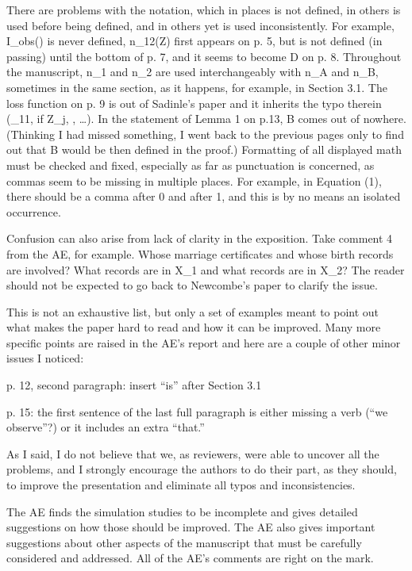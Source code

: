 \documentclass[letterpaper, parskip]{scrartcl}
\begin{document}
	There are problems with the notation, which in places is not defined, in others is used before being defined, and in others yet is used inconsistently.  For example, I_obs() is never defined, n_12(Z) first appears on p. 5, but is not defined (in passing) until the bottom of p. 7, and it seems to become D on p. 8.  Throughout the manuscript, n_1 and n_2 are used interchangeably with n_A and n_B, sometimes in the same section, as it happens, for example, in Section 3.1.  The loss function on p. 9 is out of Sadinle’s paper and it inherits the typo therein (\theta_11, if Z_j, , …).  In the statement of Lemma 1 on p.13, B comes out of nowhere.  (Thinking I had missed something, I went back to the previous pages only to find out that B would be then defined in the proof.)  Formatting of all displayed math must be checked and fixed, especially as far as punctuation is concerned, as commas seem to be missing in multiple places.  For example, in Equation (1), there should be a comma after 0 and after 1, and this is by no means an isolated occurrence.
	
	Confusion can also arise from lack of clarity in the exposition.  Take comment 4 from the AE, for example.  Whose marriage certificates and whose birth records are involved?  What records are in X_1 and what records are in X_2?  The reader should not be expected to go back to Newcombe’s paper to clarify the issue. 
	
	This is not an exhaustive list, but only a set of examples meant to point out what makes the paper hard to read and how it can be improved.  Many more specific points are raised in the AE’s report and here are a couple of other minor issues I noticed:
	
	p. 12, second paragraph:  insert “is” after Section 3.1
	
	p. 15:  the first sentence of the last full paragraph is either missing a verb (“we observe”?) or it includes an extra “that.”
	
	As I said, I do not believe that we, as reviewers, were able to uncover all the problems, and I strongly encourage the authors to do their part, as they should, to improve the presentation and eliminate all typos and inconsistencies.
	
	The AE finds the simulation studies to be incomplete and gives detailed suggestions on how those should be improved.  The AE also gives important suggestions about other aspects of the manuscript that must be carefully considered and addressed.  All of the AE’s comments are right on the mark.
	
\end{document}
